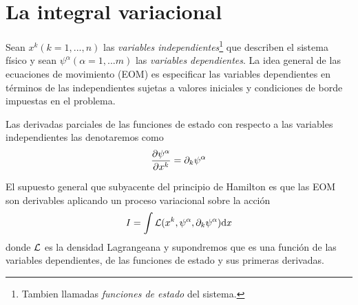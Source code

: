 \section{La integral variacional}
Sean $x^k(k=1,...,n)$ las \textit{variables independientes}\footnote{Tambien llamadas \textit{funciones de estado} del sistema.} que describen el sistema físico y sean $\psi^\alpha (\alpha=1,...m)$ las \textit{variables dependientes}. La idea general de las ecuaciones de movimiento (EOM) es especificar las variables dependientes en términos de las independientes sujetas a valores iniciales y condiciones de borde impuestas en el problema.

Las derivadas parciales de las funciones de estado con respecto a las variables independientes las denotaremos como 
\begin{equation}
  \pdv{\psi^\alpha}{x^k}=\partial_k\psi^\alpha
\end{equation}

El supuesto general que subyacente del principio de Hamilton es que las EOM son derivables aplicando un proceso variacional sobre la acción
\begin{equation}\label{accion}
  I=\int\mathcal{L}(x^k,\psi^\alpha,\partial_k\psi^\alpha)\dd x
\end{equation}
donde $\mathcal{L}$ es la densidad Lagrangeana y supondremos que es una función de las variables dependientes, de las funciones de estado y sus primeras derivadas.
